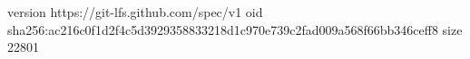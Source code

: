 version https://git-lfs.github.com/spec/v1
oid sha256:ac216c0f1d2f4c5d3929358833218d1c970e739c2fad009a568f66bb346ceff8
size 22801
